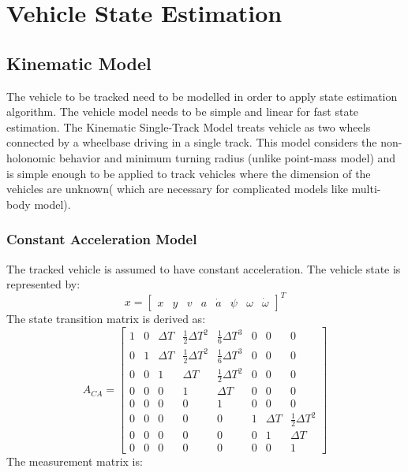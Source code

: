 \chapter{Vehicle State Estimation} \label{ch:state_estimation}
\section{Kinematic Model}
The vehicle to be tracked need to be modelled in order to apply state estimation algorithm. The vehicle model needs to be simple and linear for fast state estimation. The Kinematic Single-Track Model treats vehicle as two wheels connected by a wheelbase driving in a single track. This model considers the non-holonomic behavior and minimum turning radius (unlike point-mass model) and is simple enough to be applied to track vehicles where the dimension of the vehicles are unknown( which are necessary for complicated models like multi-body model).
\subsection{Constant Acceleration Model}
The tracked vehicle is assumed to have constant acceleration. The vehicle state is represented by:
\begin{equation*}
x =[ 
\begin{matrix}
x & y & v & a & \dot{a} & \psi & \omega & \dot{\omega}
\end{matrix}
]^T
\end{equation*}
The state transition matrix is derived as:
\begin{equation*}
A_{CA} = \left[
\begin{matrix}
1 & 0 & \Delta T & \frac{1}{2} \Delta T ^2 & \frac{1}{6}\Delta T^3 & 0 & 0 & 0 \\
0 & 1 & \Delta T & \frac{1}{2} \Delta T ^2 & \frac{1}{6}\Delta T^3 & 0 & 0 & 0 \\
0 & 0 & 1 & \Delta T & \frac{1}{2} \Delta T ^2 & 0 & 0 & 0 \\
0 & 0 & 0 & 1 & \Delta T & 0 & 0 & 0 \\
0 & 0 & 0 & 0 & 1 & 0 & 0 & 0 \\
0 & 0 & 0 & 0 & 0 & 1 & \Delta T & \frac{1}{2}\Delta T^2 \\
0 & 0 & 0 & 0 & 0 & 0 & 1 & \Delta T\\
0 & 0 & 0 & 0 & 0 & 0 & 0 & 1
\end{matrix}
\right]
\end{equation*}
The measurement matrix is:

